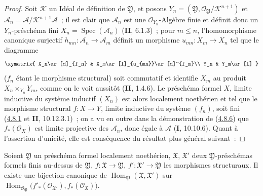 \begin{proof}
Soit $\mathcal K$ un Idéal de définition de $\mathfrak Y$, et posons
$Y_n=(\mathfrak Y,\mathcal O_{\mathfrak Y}/\mathcal K^{n+1})$ et
$\mathcal A_n=\mathcal A/\mathcal K^{n+1}\mathcal A$~;
il est clair que $\mathcal A_n$ est une $\mathcal O_{Y_n}$-Algèbre finie et
définit donc un
$Y_n$-préschéma fini $X_n=\operatorname{Spec}(\mathcal A_n)$ (\textbf{II}, 6.1.3)~;
pour $m\leq n$, l'homomorphisme canonique surjectif
$h_{mn}:\mathcal A_n\to\mathcal A_m$ définit un morphisme
$u_{mn}:X_m\to X_n$ tel que le diagramme
\[
\xymatrix{
X_n\ar[d]_{f_n} & X_m\ar[l]_{u_{mn}}\ar[d]^{f_m}\\
Y_n & Y_m\ar[l]
}
\]
($f_n$ étant le morphisme structural) soit commutatif et identifie $X_m$ au
produit $X_n\times_{Y_n}Y_m$, comme on le voit aussitôt (\textbf{II}, 1.4.6). Le
préschéma formel $X$, limite inductive du système inductif $(X_n)$
est alors localement noethérien et tel que le morphisme structural
$f:X\to Y$, limite inductive du système $(f_n)$, soit fini
(\hyperref[III.4.8.1-fr]{4.8.1} et \textbf{II}, 10.12.3.1)~; on a vu en outre dans la
démonstration de (\hyperref[III.4.8.6-fr]{4.8.6}) que
$f_*(\mathcal O_X)$ est limite projective des $\mathcal A_n$, donc
égale à $\mathcal A$ (\textbf{I}, 10.10.6). Quant à l'assertion d'unicité, elle est
conséquence du résultat plus général suivant~:
\end{proof}

\begin{proposition}[4.8.8]
\label{III.4.8.8-fr}
Soient $\mathfrak Y$ un préschéma formel localement noethérien,
$\mathfrak X$, $\mathfrak X'$ deux $\mathfrak Y$-préschémas formels finis
au-dessus de $\mathfrak Y$, $f:\mathfrak X\to\mathfrak Y$,
$f':\mathfrak X'\to\mathfrak Y$ les morphismes structuraux. Il existe une
bijection canonique de
$\operatorname{Hom}_{\mathfrak Y}(\mathfrak X,\mathfrak X')$
sur
$\operatorname{Hom}_{\mathcal O_{\mathfrak Y}}
\bigl(f'_*(\mathcal O_{\mathfrak X'}),f_*(\mathcal O_{\mathfrak X})\bigr)$\footnotemark.
\end{proposition}

